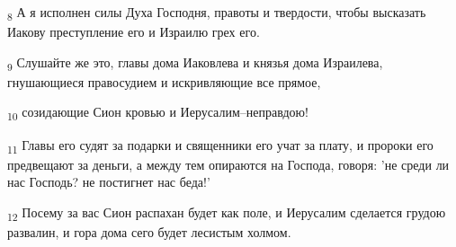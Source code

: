 \begin{tcolorbox}
\textsubscript{8} А я исполнен силы Духа Господня, правоты и твердости, чтобы высказать Иакову преступление его и Израилю грех его.
\end{tcolorbox}
\begin{tcolorbox}
\textsubscript{9} Слушайте же это, главы дома Иаковлева и князья дома Израилева, гнушающиеся правосудием и искривляющие все прямое,
\end{tcolorbox}
\begin{tcolorbox}
\textsubscript{10} созидающие Сион кровью и Иерусалим--неправдою!
\end{tcolorbox}
\begin{tcolorbox}
\textsubscript{11} Главы его судят за подарки и священники его учат за плату, и пророки его предвещают за деньги, а между тем опираются на Господа, говоря: 'не среди ли нас Господь? не постигнет нас беда!'
\end{tcolorbox}
\begin{tcolorbox}
\textsubscript{12} Посему за вас Сион распахан будет как поле, и Иерусалим сделается грудою развалин, и гора дома сего будет лесистым холмом.
\end{tcolorbox}
